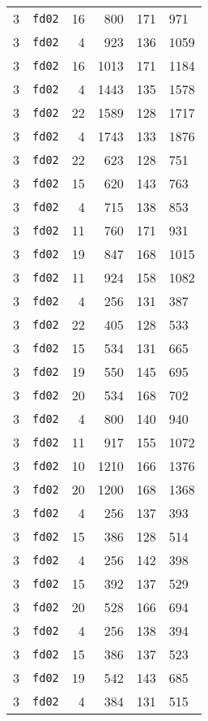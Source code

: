 \documentclass{article}
\begin{document}
\begin{table}[h!]
\begin{tabular}{llrrrl}
    3 & \texttt{fd02} & 16 & 800 & 171 & 971 \\
    3 & \texttt{fd02} & 4 & 923 & 136 & 1059 \\
    3 & \texttt{fd02} & 16 & 1013 & 171 & 1184 \\
    3 & \texttt{fd02} & 4 & 1443 & 135 & 1578 \\
    3 & \texttt{fd02} & 22 & 1589 & 128 & 1717 \\
    3 & \texttt{fd02} & 4 & 1743 & 133 & 1876 \\
    3 & \texttt{fd02} & 22 & 623 & 128 & 751 \\
    3 & \texttt{fd02} & 15 & 620 & 143 & 763 \\
    3 & \texttt{fd02} & 4 & 715 & 138 & 853 \\
    3 & \texttt{fd02} & 11 & 760 & 171 & 931 \\
    3 & \texttt{fd02} & 19 & 847 & 168 & 1015 \\
    3 & \texttt{fd02} & 11 & 924 & 158 & 1082 \\
    3 & \texttt{fd02} & 4 & 256 & 131 & 387 \\
    3 & \texttt{fd02} & 22 & 405 & 128 & 533 \\
    3 & \texttt{fd02} & 15 & 534 & 131 & 665 \\
    3 & \texttt{fd02} & 19 & 550 & 145 & 695 \\
    3 & \texttt{fd02} & 20 & 534 & 168 & 702 \\
    3 & \texttt{fd02} & 4 & 800 & 140 & 940 \\
    3 & \texttt{fd02} & 11 & 917 & 155 & 1072 \\
    3 & \texttt{fd02} & 10 & 1210 & 166 & 1376 \\
    3 & \texttt{fd02} & 20 & 1200 & 168 & 1368 \\
    3 & \texttt{fd02} & 4 & 256 & 137 & 393 \\
    3 & \texttt{fd02} & 15 & 386 & 128 & 514 \\
    3 & \texttt{fd02} & 4 & 256 & 142 & 398 \\
    3 & \texttt{fd02} & 15 & 392 & 137 & 529 \\
    3 & \texttt{fd02} & 20 & 528 & 166 & 694 \\
    3 & \texttt{fd02} & 4 & 256 & 138 & 394 \\
    3 & \texttt{fd02} & 15 & 386 & 137 & 523 \\
    3 & \texttt{fd02} & 19 & 542 & 143 & 685 \\
    3 & \texttt{fd02} & 4 & 384 & 131 & 515 \\

\end{tabular}
\end{table}
\end{document}
